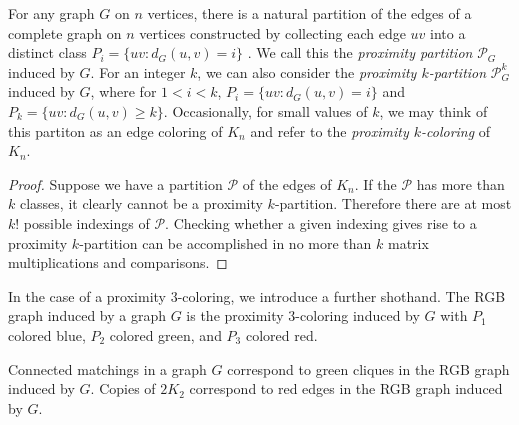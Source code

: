 For any graph $G$ on $n$ vertices, there is a natural partition of the edges of a complete graph on $n$ vertices constructed by collecting each edge $uv$ into a distinct class $P_i = \{uv : d_G(u,v) = i\}$ .  We call this the \textit{proximity partition} $\mathcal{P}_G$ induced by $G$.  For an integer $k$, we can also consider the \textit{proximity $k$-partition} $\mathcal{P}^k_G$ induced by $G$, where for $1 < i < k$, $P_i = \{uv : d_G(u,v) = i\}$ and $P_k = \{uv : d_G(u,v) \geq k\}$. Occasionally, for small values of $k$, we may think of this partiton as an edge coloring of $K_n$ and refer to the \textit{proximity $k$-coloring} of $K_n$.  

\begin{proof}
Suppose we have a partition $\mathcal{P}$ of the edges of $K_n$. If the $\mathcal{P}$ has more than $k$ classes, it clearly cannot be a proximity $k$-partition. Therefore there are at most $k!$ possible indexings of $\mathcal{P}$.  Checking whether a given indexing gives rise to a proximity $k$-partition can be accomplished in no more than $k$ matrix multiplications and comparisons.  
\end{proof}
In the case of a proximity $3$-coloring, we introduce a further shothand.  The RGB graph induced by a graph $G$ is the proximity $3$-coloring induced by $G$ with $P_1$ colored blue, $P_2$ colored green, and $P_3$ colored red.
\begin{prop}
Connected matchings in a graph $G$ correspond to green cliques in the RGB graph induced by $G$.  Copies of $2K_2$ correspond to red edges in the RGB graph induced by $G$.
\end{prop} 

